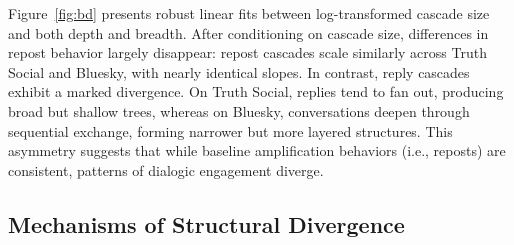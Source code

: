 \documentclass[letterpaper]{article} %
\begin{document}
Figure~\ref{fig:bd} presents robust linear fits between log-transformed cascade size and both depth and breadth. After conditioning on cascade size, differences in repost behavior largely disappear: repost cascades scale similarly across Truth Social and Bluesky, with nearly identical slopes. In contrast, reply cascades exhibit a marked divergence. On Truth Social, replies tend to fan out, producing broad but shallow trees, whereas on Bluesky, conversations deepen through sequential exchange, forming narrower but more layered structures. This asymmetry suggests that while baseline amplification behaviors (i.e., reposts) are consistent, patterns of dialogic engagement diverge.

\subsection{Mechanisms of Structural Divergence}
\end{document}
